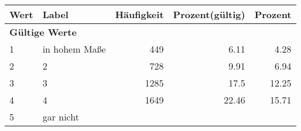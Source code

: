      \begin{longtable}{lXrrr}
     \toprule
     \textbf{Wert} & \textbf{Label} & \textbf{Häufigkeit} & \textbf{Prozent(gültig)} & \textbf{Prozent} \\
     \endhead
     \midrule
     \multicolumn{5}{l}{\textbf{Gültige Werte}}\\

     1 &
     \multicolumn{1}{X}{ in hohem Maße   } &


       \num{449} &
       \num[round-mode=places,round-precision=2]{6,11} &
         \num[round-mode=places,round-precision=2]{4,28} \\

     2 &
     \multicolumn{1}{X}{ 2   } &


       \num{728} &
       \num[round-mode=places,round-precision=2]{9,91} &
         \num[round-mode=places,round-precision=2]{6,94} \\

     3 &
     \multicolumn{1}{X}{ 3   } &


       \num{1285} &
       \num[round-mode=places,round-precision=2]{17,5} &
         \num[round-mode=places,round-precision=2]{12,25} \\

     4 &
     \multicolumn{1}{X}{ 4   } &


       \num{1649} &
       \num[round-mode=places,round-precision=2]{22,46} &
         \num[round-mode=places,round-precision=2]{15,71} \\

     5 &
     \multicolumn{1}{X}{ gar nicht   } &



\end{longtable}
